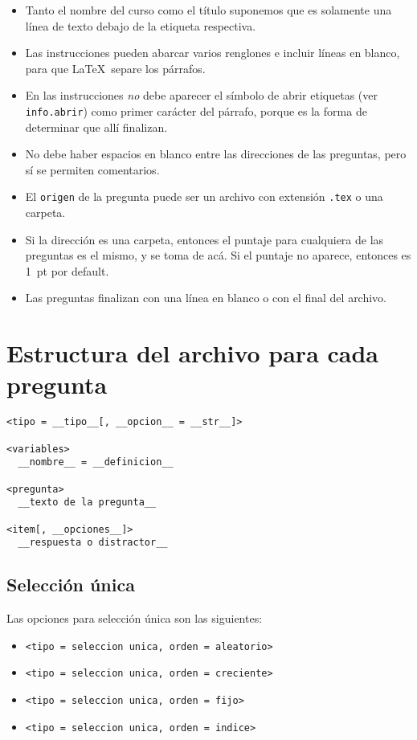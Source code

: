 \documentclass[12pt]{article}
\theoremstyle{definition}
\begin{document}
\begin{itemize}
  \item Tanto el nombre del curso como el título suponemos que es solamente una línea de texto debajo de la etiqueta respectiva.
  \item Las instrucciones pueden abarcar varios renglones e incluir líneas en blanco, para que \LaTeX\ separe los párrafos. 
  \item En las instrucciones \emph{no} debe aparecer el símbolo de abrir etiquetas (ver \verb|info.abrir|) como primer carácter del párrafo, porque es la forma de determinar que allí finalizan.
  \item No debe haber espacios en blanco entre las direcciones de las preguntas, pero sí se permiten comentarios.
  \item El \verb|origen| de la pregunta puede ser un archivo con extensión \verb|.tex| o una carpeta.
  \item Si la dirección es una carpeta, entonces el puntaje para cualquiera de las preguntas es el mismo, y se toma de acá. Si el puntaje no aparece, entonces es 1~pt por default.
  \item Las preguntas finalizan con una línea en blanco o con el final del archivo.
\end{itemize}

\section{Estructura del archivo para cada pregunta}

\begin{verbatim}
<tipo = __tipo__[, __opcion__ = __str__]>

<variables>
  __nombre__ = __definicion__

<pregunta>
  __texto de la pregunta__

<item[, __opciones__]>
  __respuesta o distractor__
\end{verbatim}

\subsection{Selección única}
Las opciones para selección única son las siguientes:
\begin{itemize}
  \item \verb|<tipo = seleccion unica, orden = aleatorio>|
  \item \verb|<tipo = seleccion unica, orden = creciente>|
  \item \verb|<tipo = seleccion unica, orden = fijo>|
  \item \verb|<tipo = seleccion unica, orden = indice>|
\end{itemize}
\end{document}
